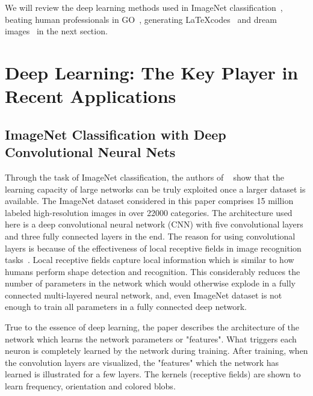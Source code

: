\documentclass[10pt]{article}
\begin{document}
\par We will review the deep learning methods used in ImageNet classification~\cite{krizhevsky2012imagenet}, beating human professionals in GO~\cite{silver2016mastering}, generating \LaTeX codes~\cite{karpathy2016unreasonable} and dream images~\cite{titcomb2016google} in the next section. 
 
\section{Deep Learning: The Key Player in Recent Applications}
\subsection{ImageNet Classification with Deep Convolutional Neural Nets}
\par Through the task of ImageNet classification, the authors of ~\cite{krizhevsky2012imagenet} show that the learning capacity of large networks can be truly exploited once a larger dataset is available. The ImageNet dataset considered in this paper comprises 15 million labeled high-resolution images in over 22000 categories. The architecture used here is a deep convolutional neural network (CNN) with five convolutional layers and three fully connected layers in the end. The reason for using convolutional layers is because of the effectiveness of local receptive fields in image recognition tasks~\cite{lecun1990handwritten}. Local receptive fields capture local information which is similar to how humans perform shape detection and recognition. This considerably reduces the number of parameters in the network which would otherwise explode in a fully connected multi-layered neural network, and, even ImageNet dataset is not enough to train all parameters in a fully connected deep network.
\par True to  the essence of deep learning, the paper describes the architecture of the network which learns the network parameters or "features". What triggers each neuron is completely learned by the network during training. After training, when the convolution layers are visualized, the "features" which the network has learned is illustrated for a few layers. The kernels (receptive fields) are shown to learn frequency, orientation and colored blobs.
\end{document}
